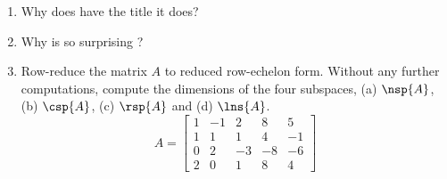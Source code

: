 \begin{enumerate}
%
\item Why does  have the title it does?
%
\item Why is  so surprising ?
%
\item Row-reduce the matrix $A$ to reduced row-echelon form.  Without any further computations, compute the dimensions of the four subspaces, (a) $\nsp{A}$, (b) $\csp{A}$, (c) $\rsp{A}$  and  (d) $\lns{A}$.
%
\begin{equation*}
A= 
\begin{bmatrix}
 1 & -1 & 2 & 8 & 5 \\
 1 & 1 & 1 & 4 & -1 \\
 0 & 2 & -3 & -8 & -6 \\
 2 & 0 & 1 & 8 & 4
\end{bmatrix}
\end{equation*}
%
\end{enumerate}